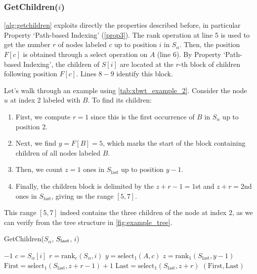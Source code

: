\subsubsection*{GetChildren($i$)}
\cref{alg:getchildren} exploits directly the properties described before, in particular Property `Path-based Indexing' (\cref{prop3}). The rank operation at line 5 is used to get the number $r$ of nodes labeled $c$ up to position $i$ in $S_{\alpha}$. Then, the position $F[c]$ is obtained through a select operation on $A$ (line 6). By Property `Path-based Indexing', the children of $S[i]$ are located at the $r$-th block of children following position $F[c]$. Lines $8 - 9$ identify this block. 

\begin{example}
    Let's walk through an example using \cref{tab:xbwt_example_2}. Consider the node $u$ at index 2 labeled with $B$. To find its children:

    \begin{enumerate}
        \item First, we compute $r = 1$ since this is the first occurrence of $B$ in $S_{\alpha}$ up to position 2.
        \item Next, we find $y = F[B] = 5$, which marks the start of the block containing children of all nodes labeled $B$.
        \item Then, we count $z = 1$ ones in $S_{\text{last}}$ up to position $y-1$.
        \item Finally, the children block is delimited by the $z+r-1 = 1$st and $z+r = 2$nd ones in $S_{\text{last}}$, giving us the range $[5,7]$.
    \end{enumerate}

    This range $[5,7]$ indeed contains the three children of the node at index 2, as we can verify from the tree structure in \cref{fig:example_tree}.
\end{example}

\begin{algorithm}[H] 
    \caption{GetChildren($S_\alpha$, $S_{\textup{last}}$, $i$)}
    \label{alg:getchildren}
    \begin{algorithmic}[1]
        \State \Return $-1$ 
    \EndIf
    \State $c = S_\alpha[i]$ 
    \State $r = \text{rank}_c(S_\alpha, i)$
    \State $y = \text{select}_1(A, c)$ 
    \State $z = \text{rank}_1(S_{\text{last}}, y - 1)$
    \State $\text{First} = \text{select}_1(S_{\text{last}}, z + r - 1) + 1$
    \State $\text{Last} = \text{select}_1(S_{\text{last}}, z + r)$
    \State \Return $(\text{First}, \text{Last})$
    \end{algorithmic}
\end{algorithm}

